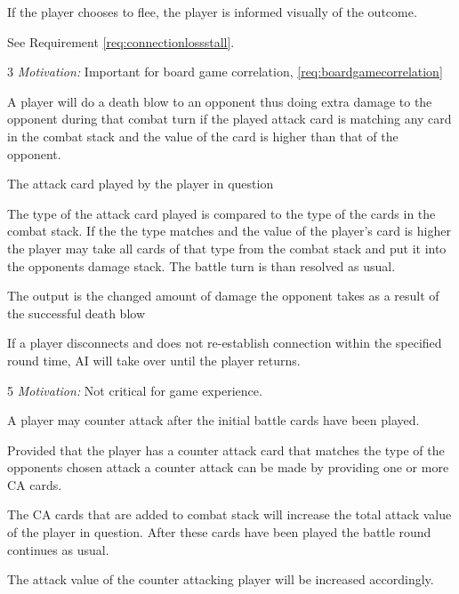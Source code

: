 If the player chooses to flee, the player is informed visually of the outcome.

See Requirement \ref{req:connectionlossstall}.

3 \emph{Motivation:} Important for board game correlation, \ref{req:boardgamecorrelation}

\stoprequirement


 A player will do a death blow to an opponent thus doing extra damage to the opponent during that combat turn if the played attack card is matching any card in the combat stack and the value of the card is higher than that of the opponent.

 The attack card played by the player in question

 The type of the attack card played is compared to the type of the cards in the combat stack. If the the type matches and the value of the player's card is higher the player may take all cards of that type from the combat stack and put it into the opponents damage stack. The battle turn is than resolved as usual.

 The output is the changed amount of damage the opponent takes as a result of the successful death blow

 If a player disconnects and does not re-establish connection within the specified round time, AI will take over until the player returns.

5 \emph{Motivation:} Not critical for game experience.

\stoprequirement


 A player may counter attack after the initial battle cards have been played.

 Provided that the player has a counter attack card that matches the type of the opponents chosen attack a counter attack can be made by providing one or more CA cards. 

 The CA cards that are added to combat stack will increase the total attack value of the player in question. After these cards have been played the battle round continues as usual.

 The attack value of the counter attacking player will be increased accordingly.

